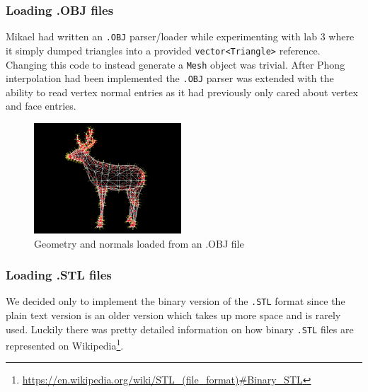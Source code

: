 \documentclass[a4paper,11pt]{article}
\begin{document}
\subsubsection{Loading .OBJ files}
Mikael had written an \texttt{.OBJ} parser/loader while experimenting with lab 3 where it simply
dumped triangles into a provided \texttt{vector<Triangle>} reference. Changing this code to instead generate a
\texttt{Mesh} object was trivial. After Phong interpolation had been implemented the \texttt{.OBJ} parser was
extended with the ability to read vertex normal entries as it had previously only cared
about vertex and face entries.

\begin{figure}[H]
\begin{center}
\includegraphics[width=5.5cm]{obj-deer.png}
\caption{Geometry and normals loaded from an .OBJ file}
\end{center}
\end{figure}
\vspace{-0.5cm}

\subsubsection{Loading .STL files}
We decided only to implement the binary version of the \texttt{.STL} format since the plain text version
is an older version which takes up more space and is rarely used. Luckily there was pretty detailed
information on how binary \texttt{.STL} files are represented on
Wikipedia\footnote{\url{https://en.wikipedia.org/wiki/STL\_(file\_format)\#Binary\_STL}}.


\end{document}
